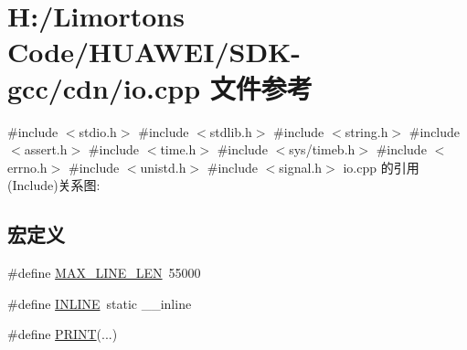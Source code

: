 \hypertarget{_s_d_k-gcc_2cdn_2io_8cpp}{}\section{H\+:/\+Limorton\textquotesingle{}s Code/\+H\+U\+A\+W\+E\+I/\+S\+D\+K-\/gcc/cdn/io.cpp 文件参考}
\label{_s_d_k-gcc_2cdn_2io_8cpp}
{\ttfamily \#include $<$stdio.\+h$>$}\newline
{\ttfamily \#include $<$stdlib.\+h$>$}\newline
{\ttfamily \#include $<$string.\+h$>$}\newline
{\ttfamily \#include $<$assert.\+h$>$}\newline
{\ttfamily \#include $<$time.\+h$>$}\newline
{\ttfamily \#include $<$sys/timeb.\+h$>$}\newline
{\ttfamily \#include $<$errno.\+h$>$}\newline
{\ttfamily \#include $<$unistd.\+h$>$}\newline
{\ttfamily \#include $<$signal.\+h$>$}\newline
io.\+cpp 的引用(Include)关系图\+:
\subsection*{宏定义}
\begin{DoxyCompactItemize}
\item 
\#define \hyperlink{_s_d_k-gcc_2cdn_2io_8cpp_a09a3b394b8602092d58347b791158062}{M\+A\+X\+\_\+\+L\+I\+N\+E\+\_\+\+L\+EN}~55000
\item 
\#define \hyperlink{_s_d_k-gcc_2cdn_2io_8cpp_a2eb6f9e0395b47b8d5e3eeae4fe0c116}{I\+N\+L\+I\+NE}~static \+\_\+\+\_\+inline
\item 
\#define \hyperlink{_s_d_k-gcc_2cdn_2io_8cpp_a15bb631053a1fce9c5470701900984c7}{P\+R\+I\+NT}(...)
\end{DoxyCompactItemize}
